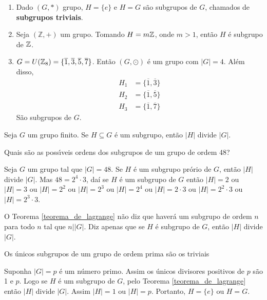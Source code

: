\begin{exemplos}
	\begin{enumerate}[label={\arabic*})]
		\item Dado $(G,*)$ grupo, $H=\{e\}$ e $H=G$ s{\~a}o subgrupos de $G$, chamados de \textbf{subgrupos triviais}.
		\item Seja $(\mathbb{Z},+)$ um grupo. Tomando $H = m\mathbb{Z}$, onde $m > 1$, ent{\~a}o $H$ {\'e} subgrupo de $\mathbb{Z}$.
		\item $G = U(\mathbb{Z}_8) = \{\overline{1}, \overline{3}, \overline{5}, \overline{7}\}$. Então $(G,\odot)$ {\'e} um grupo com $|G| = 4$. Além disso,
		\begin{align*}
			H_1 &= \{\overline{1}, \overline{3}\}\\
			H_2 &= \{\overline{1}, \overline{5}\}\\
			H_3 &= \{\overline{1}, \overline{7}\}
		\end{align*}
		São subgrupos de $G$.
		
	\end{enumerate}
\end{exemplos}


\begin{teorema}\label{teorema_de_lagrange}
	Seja $G$ um grupo finito. Se $H\subseteq G$ {\'e} um subgrupo, ent{\~a}o $|H|$ divide $|G|$.
\end{teorema}

\begin{exemplo}
	Quais s{\~a}o as poss{\'\i}veis ordens dos subgrupos de um grupo de ordem 48?
	\begin{solucao}
		Seja $G$ um grupo tal que $|G|=48$. Se $H$ {\'e} um subgrupo prório de $G$, ent{\~a}o $|H|$ divide $|G|$. Mas $48=2^{4}\cdot 3$, daí se $H$ é um subgrupo de $G$ então $|H|=2$ ou $|H|=3$ ou $|H|= 2^{2}$ ou $|H|=2^{3}$ ou $|H|=2^{4}$ ou $|H|=2\cdot3$ ou $|H|=2^2\cdot 3$ ou $|H|=2^3\cdot 3$.
	\end{solucao}
\end{exemplo}

\begin{observacao}
	O Teorema \ref{teorema_de_lagrange} n{\~a}o diz que haver{\'a} um subgrupo de ordem $n$ para todo $n$ tal que $n||G|$. Diz apenas que se $H$ {\'e} subgrupo de $G$, ent{\~a}o $|H|$ divide $|G|$.
\end{observacao}

\begin{corolario}
	Os {\'u}nicos subgrupos de um grupo de ordem prima s{\~a}o os triviais
\end{corolario}
\begin{prova}
	Suponha $|G| = p$ é um número primo. Assim os {\'u}nicos divisores positivos de $p$ s{\~a}o 1 e $p$. Logo se $H$ {\'e} um subgrupo de $G$, pelo Teorema \ref{teorema_de_lagrange} ent{\~a}o $|H|$ divide $|G|$. Assim $|H| = 1$ ou $|H| = p$. Portanto, $H=\{e\}$ ou $H = G$.
\end{prova}


